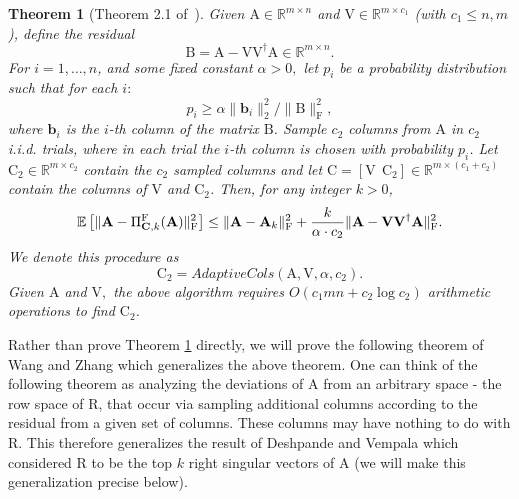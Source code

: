 \documentclass[11pt]{article}
\newcommand{\Expect}[1]{\mbox{}{\mathbb{E}}\left[#1\right]}
\newcommand{\FNormS}[1]{\mbox{}\|#1\|_\mathrm{F}^2}
\newcommand{\TNormS}[1]{\mbox{}\|#1\|_2^2}
\newtheorem{theorem}{Theorem}
\newcommand{\mat}[1]{{\ensuremath{\bm{\mathrm{#1}}}}}
\def\b{{\mathbf b}}
\def\matA{\mat{A}}
\def\matB{\mat{B}}
\def\matC{\mat{C}}
\def\matR{\mat{R}}
\def\matV{\mat{V}}
\def\math#1{$#1$}
\def\frac#1#2{{#1\over #2}}
\def\b{{\mathbf b}}
\begin{document}
\begin{theorem}[Theorem 2.1 of~\cite{DRVW06}]
\label{thm:adaptivecolumns}
Given $\matA \in \mathbb{R}^{m \times n}$ and $\matV \in \mathbb{R}^{m \times c_1}$ (with $c_1 \le n, m$),
define the residual
$$\matB = \matA - \matV \matV^{\dagger} \matA \in \mathbb{R}^{m \times n}.$$
For $i=1,\ldots,n$, and some fixed constant  $\alpha >0 ,$ let $p_i$ be a probability distribution such that for each $i:$
$$p_i \ge \alpha {\TNormS{\b_{i}}}/{\FNormS{\matB}},$$
where $\b_i$ is the $i$-th column of the matrix $\matB$. Sample
$c_2$ columns from $\matA$ in \math{c_2} i.i.d. trials, where in each trial the $i$-th column is chosen with probability $p_i$.
Let $\matC_2 \in \mathbb{R}^{m \times c_2}$ contain the $c_2$ sampled columns and let $\matC = [\matV\ \ \matC_2] \in \mathbb{R}^{m \times (c_1+c_2)}$
contain the columns of $\matV$ and $\matC_2$. Then, for any integer $k > 0$,
$$\Expect{ \FNormS{ \matA - \Pi_{\matC,k}^{\mathrm{F}}(\matA) } } \le \FNormS{\matA - \matA_k } 
+ \frac{k}{\alpha \cdot c_2} \FNormS{\matA - \matV \matV^{\dagger} \matA}.$$
We denote this procedure as
$$\matC_2 = AdaptiveCols(\matA, \matV, \alpha, c_2).$$
Given $\matA$ and $\matV,$ the above algorithm requires $O( c_1 m n + c_2 \log c_2 )$ arithmetic operations to find $\matC_2$.
\end{theorem}
Rather than prove Theorem \ref{thm:adaptivecolumns} directly, we will prove the following theorem of Wang and Zhang 
which generalizes
the above theorem. One can think
of the following theorem as analyzing the deviations of $\matA$ from an
arbitrary space - the row space of $\matR$, that occur via sampling additional
columns according to the residual from a given set of columns. These columns
may have nothing to do with $\matR$. This therefore generalizes the result
of Deshpande and Vempala which considered $\matR$ to be the top $k$ right singular
vectors of $\matA$ (we will make this generalization precise below). 
\end{document}
